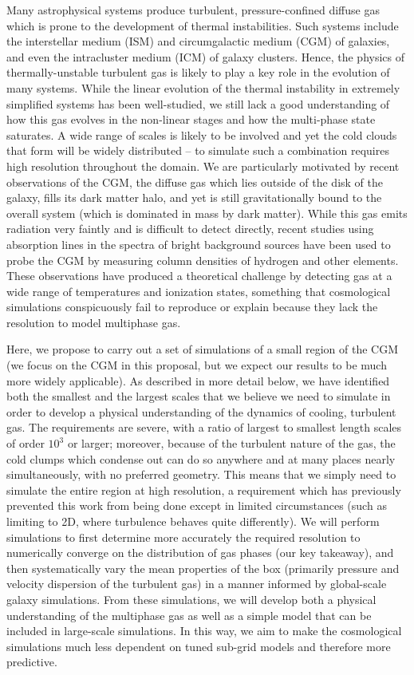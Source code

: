 \documentclass[11pt,letterpaper,english]{article}
\begin{document}
Many astrophysical systems produce turbulent, pressure-confined diffuse gas which is prone to the development of thermal instabilities. Such systems include the interstellar medium (ISM) and circumgalactic medium (CGM) of galaxies, and even the intracluster medium (ICM) of galaxy clusters. Hence, the physics of thermally-unstable turbulent gas is likely to play a key role in the evolution of many systems. While the linear evolution of the thermal instability in extremely simplified systems has been well-studied, we still lack a good understanding of how this gas evolves in the non-linear stages and how the multi-phase state saturates. A wide range of scales is likely to be involved and yet the cold clouds that form will be widely distributed -- to simulate such a combination requires high resolution throughout the domain. We are particularly motivated by recent observations of the CGM, the diffuse gas which lies outside of the disk of the galaxy, fills its dark matter halo, and yet is still gravitationally bound to the overall system (which is dominated in mass by dark matter). While this gas emits radiation very faintly and is difficult to detect directly, recent studies using absorption lines in the spectra of bright background sources have been used to probe the CGM by measuring column densities of hydrogen and other elements. These observations have produced a theoretical challenge by detecting gas at a wide range of temperatures and ionization states, something that cosmological simulations conspicuously fail to reproduce or explain because they lack the resolution to model multiphase gas.

Here, we propose to carry out a set of simulations of a small region of the CGM (we focus on the CGM in this proposal, but we expect our results to be much more widely applicable).  As described in more detail below, we have identified both the smallest and the largest scales that we believe we need to simulate in order to develop a physical understanding of the dynamics of cooling, turbulent gas.  The requirements are severe, with a ratio of largest to smallest length scales of order $10^{3}$ or larger; moreover, because of the turbulent nature of the gas, the cold clumps which condense out can do so anywhere and at many places nearly simultaneously, with no preferred geometry.  This means that we simply need to simulate the entire region at high resolution, a requirement which has previously prevented this work from being done except in limited circumstances (such as limiting to 2D, where turbulence behaves quite differently).  We will perform simulations to first determine more accurately the required resolution to numerically converge on the distribution of gas phases (our key takeaway), and then systematically vary the mean properties of the box (primarily pressure and velocity dispersion of the turbulent gas) in a manner informed by global-scale galaxy simulations. From these simulations, we will develop both a physical understanding of the multiphase gas as well as a simple model that can be included in large-scale simulations.  In this way, we aim to make the cosmological simulations much less dependent on tuned sub-grid models and therefore more predictive.
\end{document}
